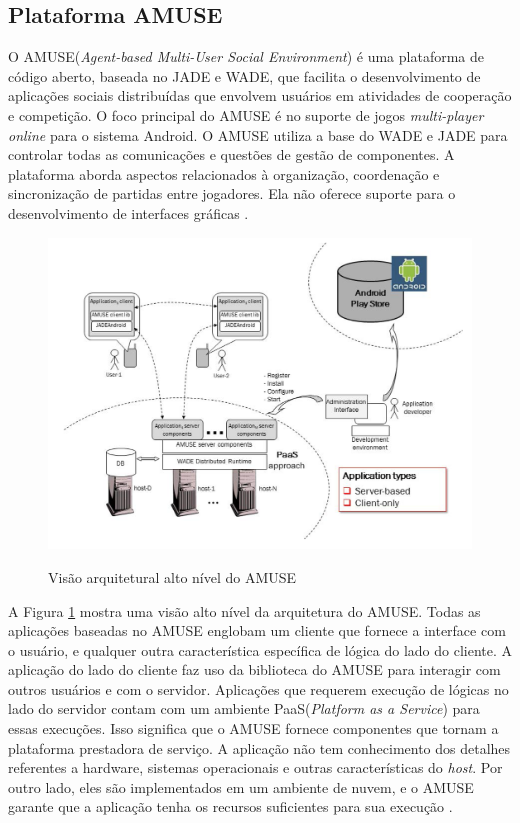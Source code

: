     \subsection{Plataforma AMUSE}

O AMUSE(\textit{Agent-based Multi-User Social Environment}) é uma plataforma de código aberto, baseada no JADE e WADE, que facilita o desenvolvimento de aplicações sociais distribuídas que envolvem usuários em atividades de cooperação e competição. O foco principal do AMUSE é no suporte de jogos \textit{multi-player online} para o sistema Android. O AMUSE utiliza a base do WADE e JADE para controlar todas as comunicações e questões de gestão de componentes. A plataforma aborda aspectos relacionados à organização, coordenação e sincronização de partidas entre jogadores. Ela não oferece suporte para o desenvolvimento de interfaces gráficas \cite{amuse}.

\begin{figure}[h]
  \centering
  \includegraphics[width=13cm]{figuras/amuse_architecture}
  \caption{Visão arquitetural alto nível do AMUSE}
  \cite{bergenti2015}
  \label{figura:amuse_architecture}
\end{figure}

A Figura \ref{figura:amuse_architecture} mostra uma visão alto nível da arquitetura do AMUSE. Todas as aplicações baseadas no AMUSE englobam um cliente que fornece a interface com o usuário, e qualquer outra característica específica de lógica do lado do cliente. A aplicação do lado do cliente faz uso da biblioteca do AMUSE para interagir com outros usuários e com o servidor.
Aplicações que requerem execução de lógicas no lado do servidor contam com um ambiente PaaS(\textit{Platform as a Service}) para essas execuções. Isso significa que o AMUSE fornece componentes que tornam a plataforma prestadora de serviço. A aplicação não tem conhecimento dos detalhes referentes a hardware, sistemas operacionais e outras características do \textit{host}. Por outro lado, eles são implementados em um ambiente de nuvem, e o AMUSE garante que a aplicação tenha os recursos suficientes para sua execução \cite{amuseStartupGuide}.

